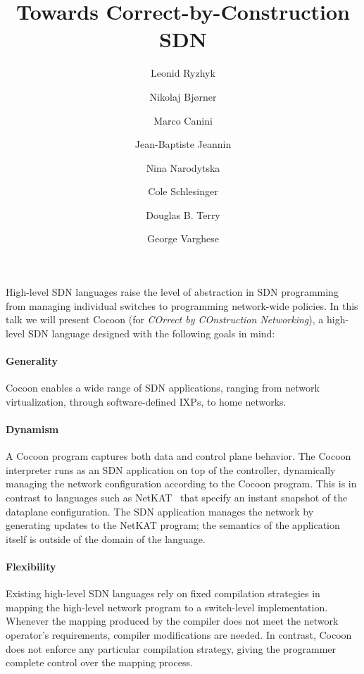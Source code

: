 \documentclass[letterpaper,10pt,twocolumn]{article}
\begin{document}
\title{\vspace{-3cm}Towards Correct-by-Construction SDN}

\author[1]{Leonid Ryzhyk}
\author[2]{Nikolaj Bj{\o}rner}
\author[3]{Marco Canini}
\author[1]{Jean-Baptiste Jeannin}
\author[1]{Nina Narodytska}
\author[1]{Cole Schlesinger}
\author[1]{Douglas B. Terry}
\author[2]{George Varghese}


\date{}
\maketitle

High-level SDN languages raise the level of abstraction in SDN 
programming from managing individual switches to programming 
network-wide policies.  In this talk we will present Cocoon (for 
\emph{COrrect by COnstruction Networking}), a high-level SDN 
language designed with the following goals in mind:

\paragraph{Generality} Cocoon enables a wide range of SDN 
applications, ranging from network virtualization, through 
software-defined IXPs, to home networks. 


\paragraph{Dynamism} A Cocoon program captures both data and 
control plane behavior.  The Cocoon interpreter runs as an SDN 
application on top of the controller, dynamically managing the 
network configuration according to the Cocoon program.  This is in 
contrast to languages such as NetKAT~\cite{Smolka_EFG_15} that 
specify an instant snapshot of the dataplane configuration.  The 
SDN application manages the network by generating updates to the 
NetKAT program; the semantics of the application itself is outside 
of the domain of the language.  

\paragraph{Flexibility} Existing high-level SDN languages rely on 
fixed compilation strategies in mapping the high-level network 
program to a switch-level implementation.  Whenever the mapping 
produced by the compiler does not meet the network operator's 
requirements, compiler modifications are needed.  In contrast, 
Cocoon does not enforce any particular compilation strategy, 
giving the programmer complete control over the mapping process.
\end{document}
